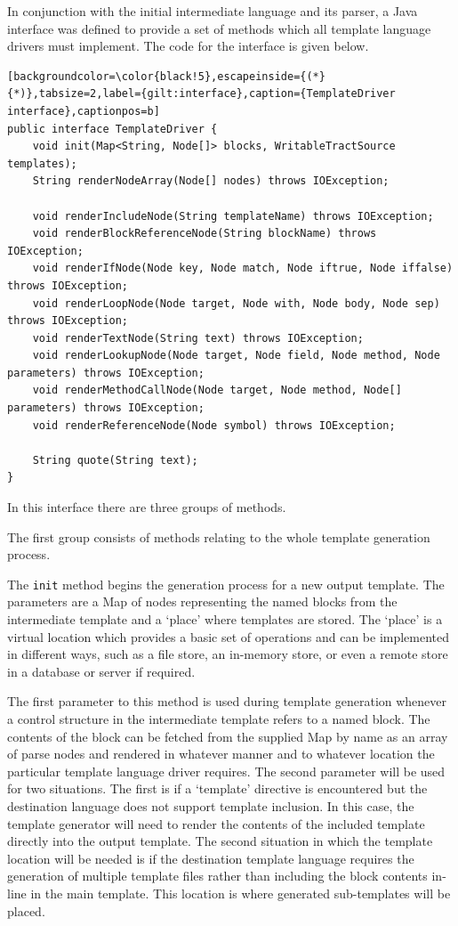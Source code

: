 In conjunction with the initial intermediate language and its parser, a Java interface was defined to provide a set of methods which all template language drivers must implement. The code for the interface is given below.

\begin{lstlisting}[backgroundcolor=\color{black!5},escapeinside={(*}{*)},tabsize=2,label={gilt:interface},caption={TemplateDriver interface},captionpos=b]
public interface TemplateDriver {
	void init(Map<String, Node[]> blocks, WritableTractSource templates);
	String renderNodeArray(Node[] nodes) throws IOException;

	void renderIncludeNode(String templateName) throws IOException;
	void renderBlockReferenceNode(String blockName) throws IOException;
	void renderIfNode(Node key, Node match, Node iftrue, Node iffalse) throws IOException;
	void renderLoopNode(Node target, Node with, Node body, Node sep) throws IOException;
	void renderTextNode(String text) throws IOException;
	void renderLookupNode(Node target, Node field, Node method, Node parameters) throws IOException;
	void renderMethodCallNode(Node target, Node method, Node[] parameters) throws IOException;
	void renderReferenceNode(Node symbol) throws IOException;

	String quote(String text);
}
\end{lstlisting}

In this interface there are three groups of methods. 

The first group consists of methods relating to the whole template generation process.

The \verb!init! method begins the generation process for a new output template. The parameters are a Map of nodes representing the named blocks from the intermediate template and a `place' where templates are stored. The `place' is a virtual location which provides a basic set of operations and can be implemented in different ways, such as a file store, an in-memory store, or even a remote store in a database or server if required.

The first parameter to this method is used during template generation whenever a control structure in the intermediate template refers to a named block. The contents of the block can be fetched from the supplied Map by name as an array of parse nodes and rendered in whatever manner and to whatever location the particular template language driver requires. The second parameter will be used for two situations. The first is if a `template' directive is encountered but the destination language does not support template inclusion. In this case, the template generator will need to render the contents of the included template directly into the output template. The second situation in which the template location will be needed is if the destination template language requires the generation of multiple template files rather than including the block contents in-line in the main template. This location is where generated sub-templates will be placed.

